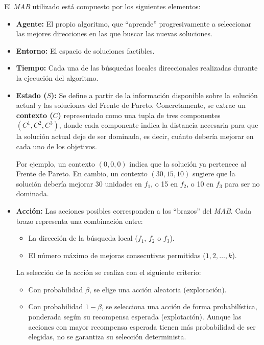 \documentclass[12pt,a4paper]{book}
\begin{document}
El \textit{MAB} utilizado está compuesto por los siguientes elementos:

\begin{itemize}
    \item \textbf{Agente:} El propio algoritmo, que ``aprende'' progresivamente a seleccionar las mejores direcciones en las que buscar las nuevas soluciones.
    
    \item \textbf{Entorno:} El espacio de soluciones factibles.
    
    \item \textbf{Tiempo:} Cada una de las búsquedas locales direccionales realizadas durante la ejecución del algoritmo.
    
    \item \textbf{Estado ($S$):} Se define a partir de la información disponible sobre la solución actual y las soluciones del Frente de Pareto. Concretamente, se extrae un \textbf{contexto ($C$)} representado como una tupla de tres componentes $(C^1, C^2, C^3)$, donde cada componente indica la distancia necesaria para que la solución actual deje de ser dominada, es decir, cuánto debería mejorar en cada uno de los objetivos.
    
    Por ejemplo, un contexto $(0, 0, 0)$ indica que la solución ya pertenece al Frente de Pareto. En cambio, un contexto $(30, 15, 10)$ sugiere que la solución debería mejorar 30 unidades en $f_1$, o 15 en $f_2$, o 10 en $f_3$ para ser no dominada.

    \item \textbf{Acción:} Las acciones posibles corresponden a los ``brazos'' del \textit{MAB}. Cada brazo representa una combinación entre:
    \begin{itemize}
        \item La dirección de la búsqueda local ($f_1$, $f_2$ o $f_3$).
        \item El número máximo de mejoras consecutivas permitidas ($1, 2, \dots, k$).
    \end{itemize}

    La selección de la acción se realiza con el siguiente criterio:
    \begin{itemize}
        \item Con probabilidad $\beta$, se elige una acción aleatoria (exploración).
        \item Con probabilidad $1 - \beta$, se selecciona una acción de forma probabilística, ponderada según su recompensa esperada (explotación). Aunque las acciones con mayor recompensa esperada tienen más probabilidad de ser elegidas, no se garantiza su selección determinista.
    \end{itemize}


\end{itemize}
\end{document}
